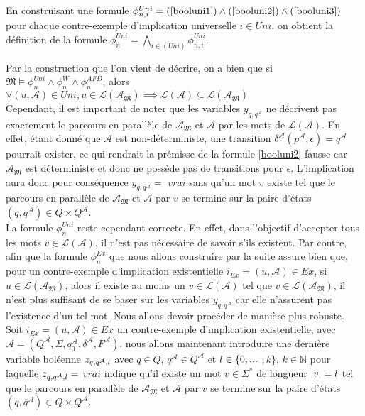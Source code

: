 \documentclass[12pt,a4paper,oneside,titlepage]{report}
\begin{document}
\noindent En construisant une formule $\phi_{n,i}^{Uni}=(\ref{booluni1})\land(\ref{booluni2})\land(\ref{booluni3})$ pour chaque contre-exemple d'implication universelle $i\in Uni$, on obtient la définition de la formule $\phi_n^{Uni}=\bigwedge_{i\in (Uni)}\phi^{Uni}_{n,i}$.

\noindent Par la construction que l'on vient de décrire, on a bien que si $\mathfrak{M}\models \phi_n^{Uni}\land\phi_n^W\land\phi_n^{AFD}$, alors $\forall (u,\mathcal{A})\in Uni, u\in\mathcal{L}(\mathcal{\mathcal{A}_\mathfrak{M}})\implies  \mathcal{L}(\mathcal{A})\subseteq \mathcal{L}(\mathcal{\mathcal{A}_\mathfrak{M}})$\\

\noindent Cependant, il est important de noter que les variables $y_{q,q^\mathcal{A}}$ ne décrivent pas exactement le parcours en parallèle de $\mathcal{A}_\mathfrak{M}$ et $\mathcal{A}$ par les mots de $\mathcal{L}(\mathcal{A})$. En effet, étant donné que $\mathcal{A}$ est non-déterministe, une transition $\delta^\mathcal{A}(p^\mathcal{A},\epsilon)=q^\mathcal{A}$ pourrait exister, ce qui rendrait la prémisse de la formule \ref{booluni2} fausse car $\mathcal{A}_\mathfrak{M}$ est déterministe et donc ne possède pas de transitions pour $\epsilon$. L'implication aura donc pour conséquence $y_{q,q^\mathcal{A}}=$ $vrai$ sans qu'un mot $v$ existe tel que le parcours en parallèle de $\mathcal{A}_\mathfrak{M}$ et $\mathcal{A}$ par $v$ se termine sur la paire d'états $(q,q^\mathcal{A})\in Q\times Q^\mathcal{A}$.\\
La formule $\phi_n^{Uni}$ reste cependant correcte. En effet, dans l'objectif d'accepter tous les mots $v\in\mathcal{L}(\mathcal{A})$, il n'est pas nécessaire de savoir s'ils existent. Par contre, afin que la formule $\phi_n^{Ex}$ que nous allons construire par la suite assure bien que, pour un contre-exemple d'implication existentielle $i_{Ex}=(u,\mathcal{A})\in Ex$, si $u\in\mathcal{L}(\mathcal{A}_\mathfrak{M})$, alors il existe au moins un $v\in\mathcal{L}(\mathcal{A})$ tel que $v\in\mathcal{L}(\mathcal{A}_\mathfrak{M})$, il n'est plus suffisant de se baser sur les variables $y_{q,q^\mathcal{A}}$ car elle n'assurent pas l'existence d'un tel mot. Nous allons devoir procéder de manière plus robuste.\\

\noindent Soit $i_{Ex}=(u,\mathcal{A})\in Ex$ un contre-exemple d'implication existentielle, avec $\mathcal{A}=(Q^\mathcal{A},\Sigma,q_0^\mathcal{A},\delta^\mathcal{A},F^\mathcal{A})$, nous allons maintenant introduire une dernière variable boléenne $z_{q,q^\mathcal{A},\mathnormal{l}}$ avec $q\in Q$, $q^\mathcal{A}\in Q^\mathcal{A}$ et $\mathnormal{l}\in \{0,...$ $,k\}$, $k\in\mathbb{N}$ pour laquelle $z_{q,q^\mathcal{A},\mathnormal{l}}=$ $vrai$ indique qu'il existe un mot $v\in\Sigma^*$ de longueur $|v|=\mathnormal{l}$ tel que le parcours en parallèle de $\mathcal{A}_\mathfrak{M}$ et $\mathcal{A}$ par $v$ se termine sur la paire d'états $(q,q^\mathcal{A})\in Q\times Q^\mathcal{A}$.\\
\end{document}
